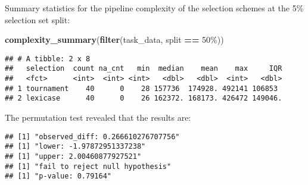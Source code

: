 \documentclass[
]{book}
\newenvironment{Shaded}{\begin{snugshade}}{\end{snugshade}}
\newcommand{\AttributeTok}[1]{\textcolor[rgb]{0.13,0.29,0.53}{#1}}
\newcommand{\DecValTok}[1]{\textcolor[rgb]{0.00,0.00,0.81}{#1}}
\newcommand{\FunctionTok}[1]{\textcolor[rgb]{0.13,0.29,0.53}{\textbf{#1}}}
\newcommand{\NormalTok}[1]{#1}
\newcommand{\OtherTok}[1]{\textcolor[rgb]{0.56,0.35,0.01}{#1}}
\newcommand{\SpecialCharTok}[1]{\textcolor[rgb]{0.81,0.36,0.00}{\textbf{#1}}}
\newcommand{\StringTok}[1]{\textcolor[rgb]{0.31,0.60,0.02}{#1}}
\begin{document}
Summary statistics for the pipeline complexity of the selection schemes at the 5\% selection set split:

\begin{Shaded}
\begin{Highlighting}[]
\FunctionTok{complexity\_summary}\NormalTok{(}\FunctionTok{filter}\NormalTok{(task\_data, split }\SpecialCharTok{==} \StringTok{\textquotesingle{}50\%\textquotesingle{}}\NormalTok{))}
\end{Highlighting}
\end{Shaded}

\begin{verbatim}
## # A tibble: 2 x 8
##   selection  count na_cnt   min  median    mean    max     IQR
##   <fct>      <int>  <int> <int>   <dbl>   <dbl>  <int>   <dbl>
## 1 tournament    40      0    28 157736  174928. 492141 106853 
## 2 lexicase      40      0    26 162372. 168173. 426472 149046.
\end{verbatim}

The permutation test revealed that the results are:

\begin{Shaded}
\end{Shaded}

\begin{verbatim}
## [1] "observed_diff: 0.266610276707756"
## [1] "lower: -1.97872951337238"
## [1] "upper: 2.00460877927521"
## [1] "fail to reject null hypothesis"
## [1] "p-value: 0.79164"
\end{verbatim}
\end{document}

